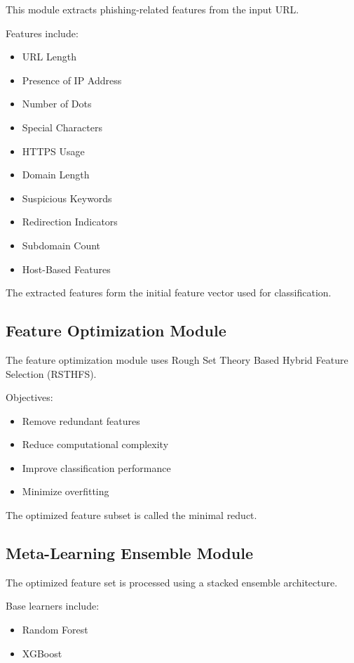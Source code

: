 \documentclass[12pt]{report}
\begin{document}
This module extracts phishing-related features from the input URL.

Features include:

\begin{itemize}
    \item URL Length
    \item Presence of IP Address
    \item Number of Dots
    \item Special Characters
    \item HTTPS Usage
    \item Domain Length
    \item Suspicious Keywords
    \item Redirection Indicators
    \item Subdomain Count
    \item Host-Based Features
\end{itemize}

The extracted features form the initial feature vector used for classification.

\subsection{Feature Optimization Module}

The feature optimization module uses Rough Set Theory Based Hybrid Feature Selection (RSTHFS).

Objectives:

\begin{itemize}
    \item Remove redundant features
    \item Reduce computational complexity
    \item Improve classification performance
    \item Minimize overfitting
\end{itemize}

The optimized feature subset is called the minimal reduct.

\subsection{Meta-Learning Ensemble Module}

The optimized feature set is processed using a stacked ensemble architecture.

Base learners include:

\begin{itemize}
    \item Random Forest
    \item XGBoost
\end{itemize}
\end{document}

